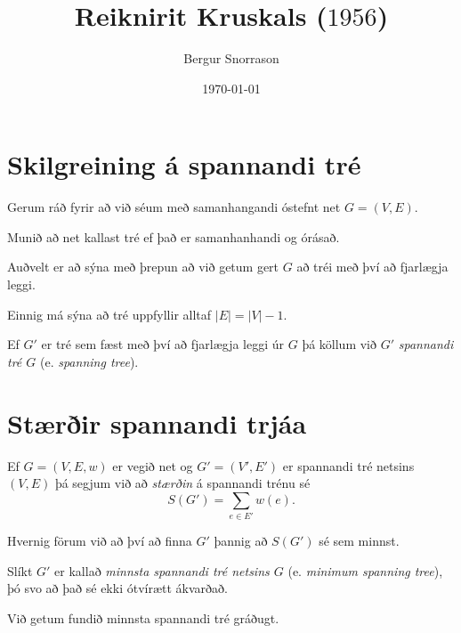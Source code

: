 \title{Reiknirit Kruskals ($1956$)}
\author{Bergur Snorrason}
\date{\today}



\frame{\titlepage}

\section{Skilgreining á spannandi tré}
{
    {
        \item<1-> Gerum ráð fyrir að við séum með samanhangandi óstefnt net $G = (V, E)$.
        \item<2-> Munið að net kallast tré ef það er samanhanhandi og órásað.
        \item<3-> Auðvelt er að sýna með þrepun að við getum gert $G$ að tréi með því að fjarlægja leggi.
        \item<4-> Einnig má sýna að tré uppfyllir alltaf $|E| = |V| - 1$.
        \item<5-> Ef $G'$ er tré sem fæst með því að fjarlægja leggi úr $G$ þá köllum við $G'$ \emph{spannandi tré $G$} (e. \emph{spanning tree}).
    }
}

\section{Stærðir spannandi trjáa}
{
    {
        \item<1-> Ef $G = (V, E, w)$ er vegið net og $G' = (V', E')$ er spannandi tré netsins $(V, E)$ þá segjum við að \emph{stærðin}
                    á spannandi trénu sé
            \[
            S(G') = \sum_{e \in E'} w(e).
                \]
        \item<2-> Hvernig förum við að því að finna $G'$ þannig að $S(G')$ sé sem minnst.
        \item<3-> Slíkt $G'$ er kallað \emph{minnsta spannandi tré netsins $G$} (e. \emph{minimum spanning tree}),
            þó svo að það sé ekki ótvírætt ákvarðað.
        \item<4-> Við getum fundið minnsta spannandi tré gráðugt.
    }
}

